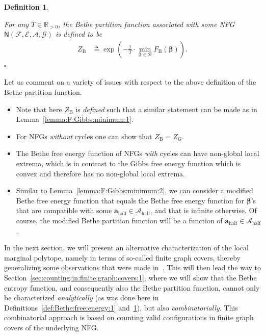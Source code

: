 \documentclass[journal, twocolumn]{IEEEtran}
\renewcommand{\mathbf}[1]{{\bm{#1}}}
\newcommand{\Rpp}{\mathbb{R}_{>0}}
\newcommand{\vect}[1]{\mathbf{#1}}
\newcommand{\set}[1]{\mathcal{#1}}
\newcommand{\graph}[1]{\mathsf{#1}}
\newcommand{\defeq}{\triangleq}
\newcommand{\bel}{\beta}
\newcommand{\vbel}{\boldsymbol{\bel}}
\newcommand{\setA}{\set{A}}
\newcommand{\setAhalf}{\set{A}_{\mathrm{half}}}
\newcommand{\setE}{\set{E}}
\newcommand{\setF}{\set{F}}
\newcommand{\setG}{\set{G}}
\newcommand{\va}{\vect{a}}
\newcommand{\vahalf}{\va_{\mathrm{half}}}
\newcommand{\lmpB}{\mathcal{B}}
\newcommand{\graphN}{\graph{N}}
\newcommand{\FBethe}{F_{\mathrm{B}}}
\newcommand{\ZBethe}{Z_{\mathrm{B}}}
\newcommand{\?}{\mathrm{?}}
\newcommand{\qedwhite}{\hspace*{\fill}%
  $\square$\smallskip}
\newcommand{\defend}{\qedwhite}
\newcommand{\ZGibbs}{Z_{\mathrm{G}}}
\newtheorem{Definition}[Lemma]{Definition}
\begin{document}
\begin{Definition}
  \label{def:Bethe:partition:function:1}

  For any $T \in \Rpp$, the Bethe partition function associated with some NFG
  $\graphN(\setF,\setE, \setA, \setG)$ is defined to be
  \begin{align*} 
    \ZBethe
      &\defeq
         \exp
           \left(
             -
             \frac{1}{T}
             \cdot
             \min_{\vbel \in \lmpB}
               \FBethe(\vbel)
           \right).
  \end{align*}
  \defend
\end{Definition}



Let us comment on a variety of issues with respect to the above definition of
the Bethe partition function.
\begin{itemize}

\item Note that here $\ZBethe$ is \emph{defined} such that a similar statement
  can be made as in Lemma~\ref{lemma:F:Gibbs:minimum:1}.

\item For NFGs \emph{without} cycles one can show that $\ZBethe = \ZGibbs$.

\item The Bethe free energy function of NFGs \emph{with}
  cycles can have non-global local extrema, which is in contrast to the Gibbs
  free energy function which is convex and therefore has no non-global local
  extrema.

\item Similar to Lemma~\ref{lemma:F:Gibbs:minimum:2}, we can consider a
  modified Bethe free energy function that equals the Bethe free energy
  function for $\vbel$'s that are compatible with some $\vahalf \in
  \setAhalf$, and that is infinite otherwise. Of course, the modified Bethe
  partition function will be a function of $\vahalf \in \setAhalf$.

\end{itemize}

In the next section, we will present an alternative characterization of the
local marginal polytope, namely in terms of so-called finite graph covers,
thereby generalizing some observations that were made
in~\cite{Koetter:Vontobel:03:1, Vontobel:Koetter:05:1:subm}. This will then
lead the way to Section~\ref{sec:counting:in:finite:graph:covers:1}, where we
will show that the Bethe entropy function, and consequently also the Bethe
partition function, cannot only be characterized \emph{analytically} (as was
done here in Definitions~\ref{def:Bethe:free:energy:1}
and~\ref{def:Bethe:partition:function:1}), but also
\emph{combinatorially}. This combinatorial approach is based on counting valid
configurations in finite graph covers of the underlying NFG.
\end{document}
